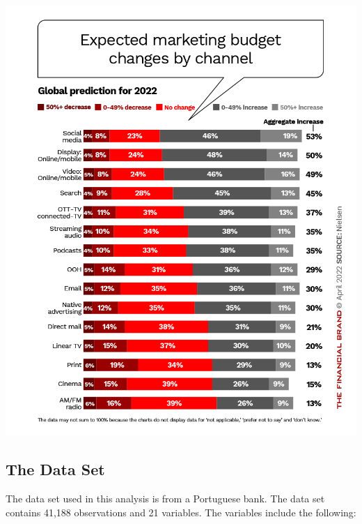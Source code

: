\documentclass[
  letterpaper,
  DIV=11,
  numbers=noendperiod]{scrartcl}
\begin{document}
\includegraphics{expected-marketing-budget-changes-by-channel.png}

\hypertarget{the-data-set}{%
\subsection{The Data Set}\label{the-data-set}}

The data set used in this analysis is from a Portuguese bank. The data
set contains 41,188 observations and 21 variables. The variables include
the following:
\end{document}
